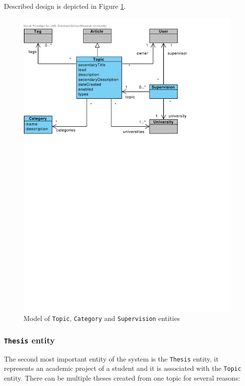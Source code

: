 Described design is depicted in Figure \ref{fig:domain-topic-category-supervision-entities}.

\begin{figure}[h]
    \centering
        \includegraphics[trim=0 510 120 30, clip, keepaspectratio, width=\textwidth]{./images/domain-topic-category-supervision-entities.pdf}
    \caption{Model of \texttt{Topic}, \texttt{Category} and \texttt{Supervision} entities}
    \label{fig:domain-topic-category-supervision-entities}
\end{figure}

\subsubsection{\texttt{Thesis} entity}

The second most important entity of the system is the \texttt{Thesis} entity, it represents an academic project of a student and it is associated with the \texttt{Topic} entity. There can be multiple theses created from one topic for several reasons:

